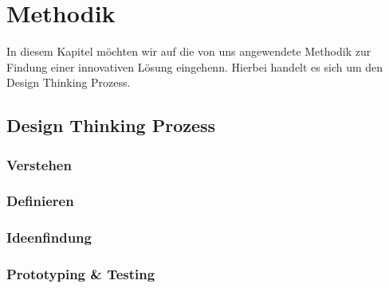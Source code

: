 \newpage

\section{Methodik} \label{methodik}
In diesem Kapitel möchten wir auf die von uns angewendete Methodik zur Findung einer innovativen Lösung eingehenn. Hierbei handelt es sich um den Design Thinking Prozess.

\subsection{Design Thinking Prozess} \label{designThinking}

\subsubsection{Verstehen} \label{verstehen}

\subsubsection{Definieren} \label{definieren}

\subsubsection{Ideenfindung} \label{ideenfindung}

\subsubsection{Prototyping \& Testing} \label{prototypingTesting}
